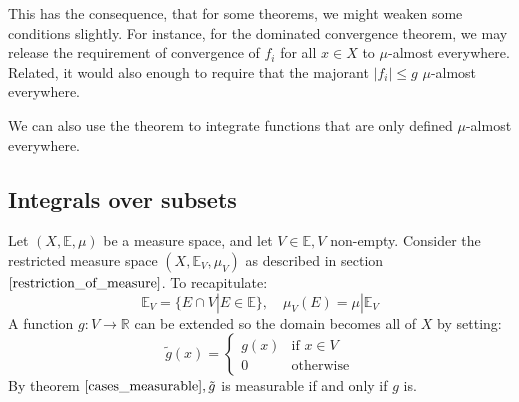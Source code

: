 \documentclass[12pt, a4paper]{article}
\numberwithin{equation}{section}
\begin{document}
This has the consequence, that for some theorems, we might weaken some conditions slightly. For instance, for the dominated convergence theorem, we may release the requirement of convergence of $f_i$ for all $x\in X$ to $\mu$-almost everywhere. Related, it would also enough to require that the majorant $|f_i|\le g$ $\mu$-almost everywhere.

We can also use the theorem to integrate functions that are only defined $\mu$-almost everywhere.

\subsection{Integrals over subsets}
Let $(X,\mathbb{E},\mu)$ be a measure space, and let $V\in\mathbb{E}, V$ non-empty. Consider the restricted measure space $(X,\mathbb{E}_V,\mu_V)$ as described in section $\ref{restriction_of_measure}$. To recapitulate:
\begin{equation}
\mathbb{E}_V=\{E\cap V|E\in\mathbb{E}\},\quad\mu_V(E)=\mu|\mathbb{E}_V
\end{equation}
A function $g: V\rightarrow\mathbb{R}$ can be extended so the domain becomes all of $X$ by setting:
\begin{equation}
\tilde{g}(x)=
\begin{cases}
g(x)	& \textrm{if }x\in V \\
0		& \textrm{otherwise}
\end{cases}
\end{equation}
By theorem $\ref{cases_measurable}, \tilde{g}$ is measurable if and only if $g$ is.
\end{document}
